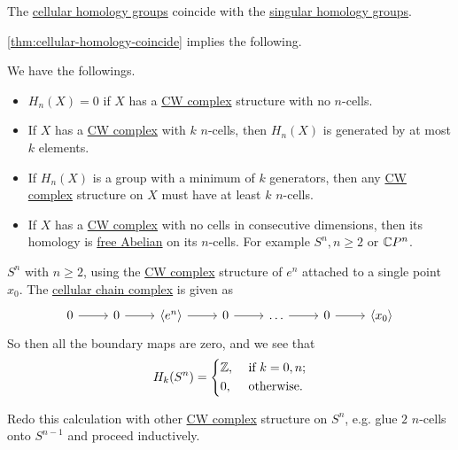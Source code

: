 \begin{theorem}\label{thm:cellular-homology-coincide}
	The \hyperref[def:cellular-homology-group]{cellular homology groups} coincide with the \hyperref[def:singular-homology-group]{singular homology groups}.
\end{theorem}

\autoref{thm:cellular-homology-coincide} implies the following.
\begin{corollary}
	We have the followings.
	\begin{itemize}
		\item \(H_n(X) = 0\) if \(X\) has a \hyperref[def:CW-Complex]{CW complex} structure with no \(n\)-cells.
		\item If \(X\) has a \hyperref[def:CW-Complex]{CW complex} with \(k\) \(n\)-cells, then \(H_n(X)\) is generated by at most \(k\) elements.
		\item If \(H_n(X)\) is a group with a minimum of \(k\) generators, then any \hyperref[def:CW-Complex]{CW complex} structure on \(X\) must have at least \(k\) \(n\)-cells.
		\item If \(X\) has a \hyperref[def:CW-Complex]{CW complex} with no cells in consecutive dimensions, then its homology is
		      \hyperref[def:free-Abelian-group]{free Abelian} on its \(n\)-cells. For example \(S^n, n \geq 2\) or \(\mathbb{\MakeUppercase{c}} P^n\).
	\end{itemize}
\end{corollary}

\begin{eg}
	\(S^n\) with \(n \geq 2\), using the \hyperref[def:CW-Complex]{CW complex} structure of \(e^n\) attached to a single point \(x_0\). The \hyperref[def:cellular-chain-complex]{cellular chain complex} is given as
	\[
		\begin{tikzcd}
			0 & 0 & {\left<e^n\right>} & 0 & \ldots & 0 & {\left<x_0\right>}
			\arrow[from=1-1, to=1-2]
			\arrow[from=1-2, to=1-3]
			\arrow[from=1-3, to=1-4]
			\arrow[from=1-4, to=1-5]
			\arrow[from=1-5, to=1-6]
			\arrow[from=1-6, to=1-7]
		\end{tikzcd}
	\]
	So then all the boundary maps are zero, and we see that
	\[
		H_k(S^n) = \begin{dcases}
			\mathbb{\MakeUppercase{z}}, & \text{ if } k=0, n ; \\
			0,                          & \text{ otherwise}.
		\end{dcases}
	\]
\end{eg}

\begin{exercise}
	Redo this calculation with other \hyperref[def:CW-Complex]{CW complex} structure on \(S^n\), e.g. glue \(2\) \(n\)-cells onto \(S^{n - 1}\) and proceed inductively.
\end{exercise}

